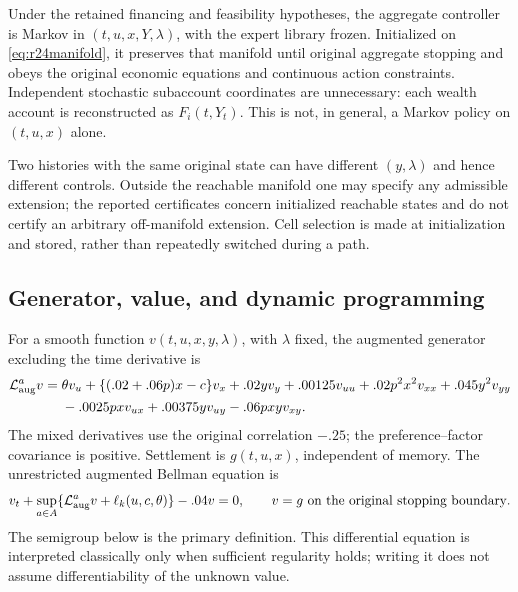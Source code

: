 \begin{proposition}\label{prop:r24realization}
Under the retained financing and feasibility hypotheses, the aggregate controller is Markov in $(t,u,x,Y,\lambda)$, with the expert library frozen. Initialized on \eqref{eq:r24manifold}, it preserves that manifold until original aggregate stopping and obeys the original economic equations and continuous action constraints. Independent stochastic subaccount coordinates are unnecessary: each wealth account is reconstructed as $F_i(t,Y_t)$. This is not, in general, a Markov policy on $(t,u,x)$ alone.
\end{proposition}
Two histories with the same original state can have different $(y,\lambda)$ and hence different controls. Outside the reachable manifold one may specify any admissible extension; the reported certificates concern initialized reachable states and do not certify an arbitrary off-manifold extension. Cell selection is made at initialization and stored, rather than repeatedly switched during a path.

\subsection{Generator, value, and dynamic programming}
For a smooth function $v(t,u,x,y,\lambda)$, with $\lambda$ fixed, the augmented generator excluding the time derivative is
\begin{align}
 \mathcal L^a_{\rm aug}v={}&\theta v_u+\{(.02+.06p)x-c\}v_x+.02y v_y
 +.00125v_{uu}+.02p^2x^2v_{xx}+.045y^2v_{yy}\notag\\
 &-.0025pxv_{ux}+.00375yv_{uy}-.06pxyv_{xy}.
 \label{eq:r24generator}
\end{align}
The mixed derivatives use the original correlation $-.25$; the preference--factor covariance is positive. Settlement is $g(t,u,x)$, independent of memory. The unrestricted augmented Bellman equation is
\begin{equation}
 v_t+\sup_{a\in A}\{\mathcal L^a_{\rm aug}v+\ell_k(u,c,\theta)\}-.04v=0,
 \qquad v=g\text{ on the original stopping boundary}.
 \label{eq:r24HJB}
\end{equation}
The semigroup below is the primary definition. This differential equation is interpreted classically only when sufficient regularity holds; writing it does not assume differentiability of the unknown value.

